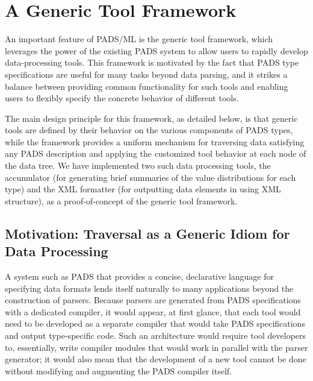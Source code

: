 \section{A Generic Tool Framework}
\label{sec:gen-tool}
An important feature of PADS/ML is the generic tool framework, which leverages the power of the existing PADS system to allow users to rapidly develop data-processing tools. This framework is motivated by the fact that PADS type specifications are useful for many tasks beyond data parsing, and it strikes a balance between providing common functionality for such tools and enabling users to flexibly specify the concrete behavior of different tools.

The main design principle for this framework, as detailed below, is that generic tools are defined by their behavior on the various components of PADS types, while the framework provides a uniform mechanism for traversing data satisfying any PADS description and applying the customized tool behavior at each node of the data tree. We have implemented two such data processing tools, the accumulator (for generating brief summaries of the value distributions for each type) and the XML formatter (for outputting data elements in using XML structure), as a proof-of-concept of the generic tool framework.

\subsection{Motivation: Traversal as a Generic Idiom for Data Processing}
\label{sec:gen-tool-motivation}
A system such as PADS that provides a concise, declarative language for specifying data formats lends itself naturally to many applications beyond the construction of parsers. Because parsers are generated from PADS specifications with a dedicated compiler, it would appear, at first glance, that each tool would need to be developed as a separate compiler that would take PADS specifications and output type-specific code. Such an architecture would require tool developers to, essentially, write compiler modules that would work in parallel with the parser generator; it would also mean that the development of a new tool cannot be done without modifying and augmenting the PADS compiler itself.

